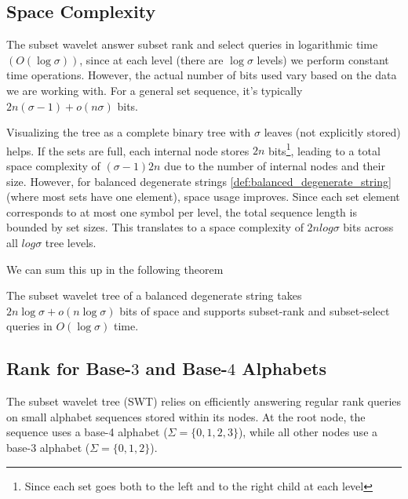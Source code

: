 \subsection*{Space Complexity}
The subset wavelet answer subset rank and select queries in logarithmic time $(O(\log \sigma))$, since at each level (there are $\log \sigma$ levels) we perform constant time operations. However, the actual number of bits used vary based on the data we are working with. For a general set sequence, it's typically $2n(\sigma - 1) + o(n\sigma)$ bits. \vspace{0.4cm}

\noindent Visualizing the tree as a complete binary tree with $\sigma$ leaves (not explicitly stored) helps. If the sets are full, each internal node stores $2n$ bits\footnote{Since each set goes both to the left and to the right child at each level}, leading to a total space complexity of $(\sigma - 1)2n$ due to the number of internal nodes and their size. However, for balanced degenerate strings \ref{def:balanced_degenerate_string} (where most sets have one element), space usage improves. Since each set element corresponds to at most one symbol per level, the total sequence length is bounded by set sizes. This translates to a space complexity of $2n log \sigma$ bits across all $log \sigma$ tree levels. \vspace{0.4cm}

\noindent We can sum this up in the following theorem

\begin{theorem} \label{thm:swt_space}
    The subset wavelet tree of a balanced degenerate string takes $2n \log \sigma + o(n \log \sigma)$ bits of space and supports subset-rank and subset-select queries in $O(\log \sigma)$ time.
\end{theorem}


\subsection*{Rank for Base-$3$ and Base-$4$ Alphabets}

The subset wavelet tree (SWT) relies on efficiently answering regular rank queries on small alphabet sequences stored within its nodes. At the root node, the sequence uses a base-4 alphabet ($\Sigma = \{0, 1, 2, 3\}$), while all other nodes use a base-3 alphabet ($\Sigma = \{0, 1, 2\}$). \vspace{0.4cm}

